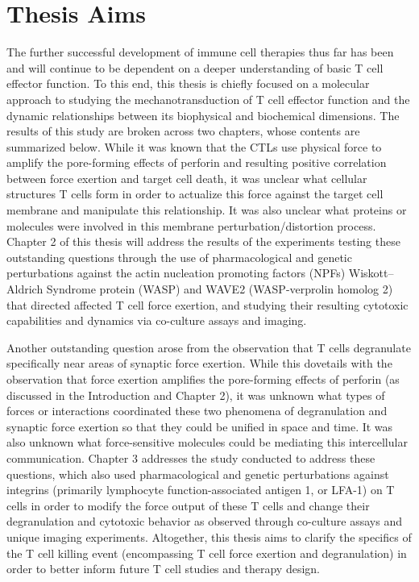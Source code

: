 \section{Thesis Aims}
The further successful development of immune cell therapies thus far has been and will continue to be dependent on a deeper understanding of basic T cell effector function. To this end, this thesis is chiefly focused on a molecular approach to studying the mechanotransduction of T cell effector function and the dynamic relationships between its biophysical and biochemical dimensions. The results of this study are broken across two chapters, whose contents are summarized below.
While it was known that the CTLs use physical force to amplify the pore-forming effects of perforin and resulting positive correlation between force exertion and  target cell death, it was unclear what cellular structures T cells form in order to actualize this force against the target cell membrane and manipulate this relationship. It was also unclear what proteins or molecules were involved in this membrane perturbation/distortion process. Chapter 2 of this thesis will address the results of the experiments testing these outstanding questions through the use of pharmacological and genetic perturbations against the actin nucleation promoting factors (NPFs) Wiskott–Aldrich Syndrome protein (WASP) and WAVE2 (WASP-verprolin homolog 2) that directed affected T cell force exertion, and studying their resulting cytotoxic capabilities and dynamics via co-culture assays and imaging.

Another outstanding question arose from the observation that T cells degranulate specifically near areas of synaptic force exertion. While this dovetails with the observation that force exertion amplifies the pore-forming effects of perforin (as discussed in the Introduction and Chapter 2), it was unknown what types of forces or interactions coordinated these two phenomena of degranulation and synaptic force exertion so that they could be unified in space and time. It was also unknown what force-sensitive molecules could be mediating this intercellular communication. Chapter 3 addresses the study conducted to address these questions, which also used pharmacological and genetic perturbations against integrins (primarily lymphocyte function-associated antigen 1, or LFA-1) on T cells in order to modify the force output of these T cells and change their degranulation and cytotoxic behavior as observed through co-culture assays and unique imaging experiments. Altogether, this thesis aims to clarify the specifics of the T cell killing event (encompassing T cell force exertion and degranulation) in order to better inform future T cell studies and therapy design.

